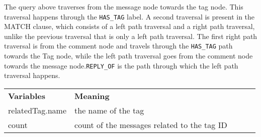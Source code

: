  The query above traverses from the message node towards the tag node. This traversal happens through the 
 \texttt{HAS\_TAG} label. A second traversal is present in the MATCH clause, which consists of a left path traversal
 and a right path traversal, unlike the previous traversal that is only a left path traversal. The first right path traversal is from the comment node and travels through the \texttt{HAS\_TAG} path towards the
 Tag node, while the left path traversal goes from the comment node towards the message node.\texttt{REPLY\_OF} is the path through which the left path traversal happens.
 
 \begin{table}[]
\begin{tabular}{|l|l|lll}
\cline{1-2}
\textbf{Variables} & \textbf{Meaning}                            &  &  &  \\ \cline{1-2}
relatedTag.name    & the name of the tag                         &  &  &  \\ \cline{1-2}
count              & count of the messages related to the tag ID &  &  &  \\ \cline{1-2}
\end{tabular}
\label{Variables and their meaning}
\label{RetCypher6BITable}
\end{table}